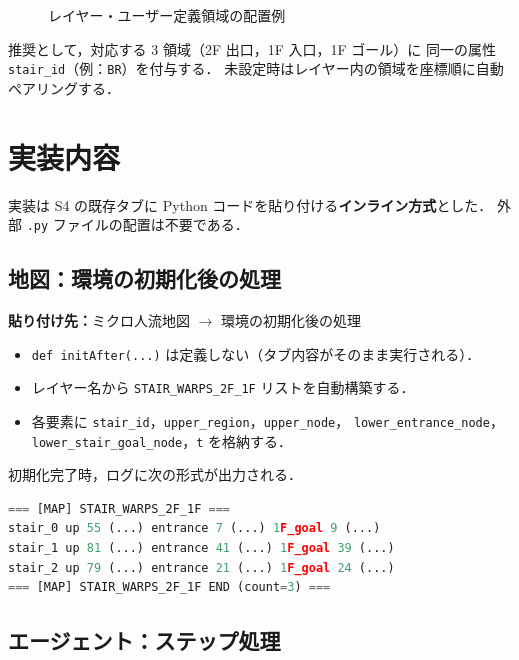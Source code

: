 \documentclass[11pt,a4paper]{ltjsarticle}
\begin{document}
\begin{figure}[H]
  \centering
  \caption{レイヤー・ユーザー定義領域の配置例}
  \label{fig:sfmmap_layers}
\end{figure}

推奨として，対応する 3 領域（2F 出口，1F 入口，1F ゴール）に
同一の属性 \texttt{stair\_id}（例：\texttt{BR}）を付与する．
未設定時はレイヤー内の領域を座標順に自動ペアリングする．

\section{実装内容}

実装は S4 の既存タブに Python コードを貼り付ける\textbf{インライン方式}とした．
外部 \texttt{.py} ファイルの配置は不要である．

\subsection{地図：環境の初期化後の処理}

\textbf{貼り付け先：}ミクロ人流地図 $\rightarrow$ 環境の初期化後の処理

\begin{itemize}
  \item \texttt{def initAfter(...)} は定義しない（タブ内容がそのまま実行される）．
  \item レイヤー名から \texttt{STAIR\_WARPS\_2F\_1F} リストを自動構築する．
  \item 各要素に \texttt{stair\_id}，\texttt{upper\_region}，\texttt{upper\_node}，
        \texttt{lower\_entrance\_node}，\texttt{lower\_stair\_goal\_node}，\texttt{t} を格納する．
\end{itemize}

初期化完了時，ログに次の形式が出力される．

\begin{lstlisting}[language=Python,caption={ワープ表構築ログの例}]
=== [MAP] STAIR_WARPS_2F_1F ===
stair_0 up 55 (...) entrance 7 (...) 1F_goal 9 (...)
stair_1 up 81 (...) entrance 41 (...) 1F_goal 39 (...)
stair_2 up 79 (...) entrance 21 (...) 1F_goal 24 (...)
=== [MAP] STAIR_WARPS_2F_1F END (count=3) ===
\end{lstlisting}

\subsection{エージェント：ステップ処理}
\end{document}
